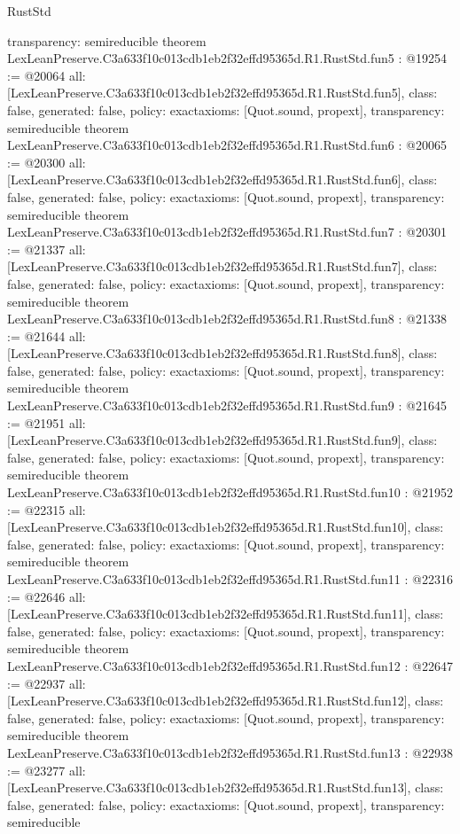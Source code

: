 \begin{lexlean}{RustStd}
\begin{coremodule}
{  transparency: semireducible
}
theorem LexLeanPreserve.C3a633f10c013cdb1eb2f32effd95365d.R1.RustStd.fun5 : @19254 := @20064 {
  all: [LexLeanPreserve.C3a633f10c013cdb1eb2f32effd95365d.R1.RustStd.fun5],
  class: false,
  generated: false,
  policy: exact{axioms: [Quot.sound, propext]},
  transparency: semireducible
}
theorem LexLeanPreserve.C3a633f10c013cdb1eb2f32effd95365d.R1.RustStd.fun6 : @20065 := @20300 {
  all: [LexLeanPreserve.C3a633f10c013cdb1eb2f32effd95365d.R1.RustStd.fun6],
  class: false,
  generated: false,
  policy: exact{axioms: [Quot.sound, propext]},
  transparency: semireducible
}
theorem LexLeanPreserve.C3a633f10c013cdb1eb2f32effd95365d.R1.RustStd.fun7 : @20301 := @21337 {
  all: [LexLeanPreserve.C3a633f10c013cdb1eb2f32effd95365d.R1.RustStd.fun7],
  class: false,
  generated: false,
  policy: exact{axioms: [Quot.sound, propext]},
  transparency: semireducible
}
theorem LexLeanPreserve.C3a633f10c013cdb1eb2f32effd95365d.R1.RustStd.fun8 : @21338 := @21644 {
  all: [LexLeanPreserve.C3a633f10c013cdb1eb2f32effd95365d.R1.RustStd.fun8],
  class: false,
  generated: false,
  policy: exact{axioms: [Quot.sound, propext]},
  transparency: semireducible
}
theorem LexLeanPreserve.C3a633f10c013cdb1eb2f32effd95365d.R1.RustStd.fun9 : @21645 := @21951 {
  all: [LexLeanPreserve.C3a633f10c013cdb1eb2f32effd95365d.R1.RustStd.fun9],
  class: false,
  generated: false,
  policy: exact{axioms: [Quot.sound, propext]},
  transparency: semireducible
}
theorem LexLeanPreserve.C3a633f10c013cdb1eb2f32effd95365d.R1.RustStd.fun10 : @21952 := @22315 {
  all: [LexLeanPreserve.C3a633f10c013cdb1eb2f32effd95365d.R1.RustStd.fun10],
  class: false,
  generated: false,
  policy: exact{axioms: [Quot.sound, propext]},
  transparency: semireducible
}
theorem LexLeanPreserve.C3a633f10c013cdb1eb2f32effd95365d.R1.RustStd.fun11 : @22316 := @22646 {
  all: [LexLeanPreserve.C3a633f10c013cdb1eb2f32effd95365d.R1.RustStd.fun11],
  class: false,
  generated: false,
  policy: exact{axioms: [Quot.sound, propext]},
  transparency: semireducible
}
theorem LexLeanPreserve.C3a633f10c013cdb1eb2f32effd95365d.R1.RustStd.fun12 : @22647 := @22937 {
  all: [LexLeanPreserve.C3a633f10c013cdb1eb2f32effd95365d.R1.RustStd.fun12],
  class: false,
  generated: false,
  policy: exact{axioms: [Quot.sound, propext]},
  transparency: semireducible
}
theorem LexLeanPreserve.C3a633f10c013cdb1eb2f32effd95365d.R1.RustStd.fun13 : @22938 := @23277 {
  all: [LexLeanPreserve.C3a633f10c013cdb1eb2f32effd95365d.R1.RustStd.fun13],
  class: false,
  generated: false,
  policy: exact{axioms: [Quot.sound, propext]},
  transparency: semireducible
}
\end{coremodule}
\end{lexlean}
